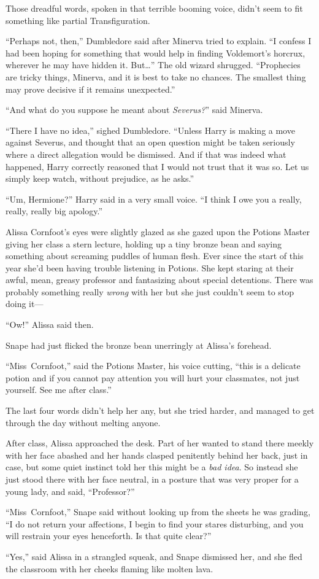 Those dreadful words, spoken in that terrible booming voice, didn’t seem to fit something like partial Transfiguration.

“Perhaps not, then,” Dumbledore said after Minerva tried to explain. “I confess I had been hoping for something that would help in finding Voldemort’s horcrux, wherever he may have hidden it. But…” The old wizard shrugged. “Prophecies are tricky things, Minerva, and it is best to take no chances. The smallest thing may prove decisive if it remains unexpected.”

“And what do you suppose he meant about \emph{Severus?}” said Minerva.

“There I have no idea,” sighed Dumbledore. “Unless Harry is making a move against Severus, and thought that an open question might be taken seriously where a direct allegation would be dismissed. And if that was indeed what happened, Harry correctly reasoned that I would not trust that it was so. Let us simply keep watch, without prejudice, as he asks.”


“Um, Hermione?” Harry said in a very small voice. “I think I owe you a really, really, really big apology.”


Alissa Cornfoot’s eyes were slightly glazed as she gazed upon the Potions Master giving her class a stern lecture, holding up a tiny bronze bean and saying something about screaming puddles of human flesh. Ever since the start of this year she’d been having trouble listening in Potions. She kept staring at their awful, mean, greasy professor and fantasizing about special detentions. There was probably something really \emph{wrong} with her but she just couldn’t seem to stop doing it—

“Ow!” Alissa said then.

Snape had just flicked the bronze bean unerringly at Alissa’s forehead.

“Miss~Cornfoot,” said the Potions Master, his voice cutting, “this is a delicate potion and if you cannot pay attention you will hurt your classmates, not just yourself. See me after class.”

The last four words didn’t help her any, but she tried harder, and managed to get through the day without melting anyone.

After class, Alissa approached the desk. Part of her wanted to stand there meekly with her face abashed and her hands clasped penitently behind her back, just in case, but some quiet instinct told her this might be a \emph{bad idea}. So instead she just stood there with her face neutral, in a posture that was very proper for a young lady, and said, “Professor?”

“Miss~Cornfoot,” Snape said without looking up from the sheets he was grading, “I do not return your affections, I begin to find your stares disturbing, and you will restrain your eyes henceforth. Is that quite clear?”

“Yes,” said Alissa in a strangled squeak, and Snape dismissed her, and she fled the classroom with her cheeks flaming like molten lava.

